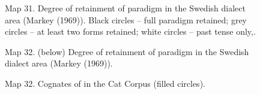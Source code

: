 \begin{figure}[h]
\centering
\begin{minipage}{5.875in}
Map 31. Degree of retainment of paradigm in the Swedish dialect area (Markey (1969)). Black circles – full paradigm retained; grey circles – at least two forms retained; white circles – past tense only,. 
\end{minipage}
\end{figure}
\begin{figure}[h]
\centering
\begin{minipage}{3.62986in}
\label{bkm:Ref224104985}Map 32. (below) Degree of retainment\newline
of paradigm\newline
in the Swedish dialect area\newline
(Markey (1969)).
\end{minipage}
\end{figure}
\clearpage%



\begin{figure}[h]
\centering
\begin{minipage}{6.28125in}
Map  32. Cognates of \textstyleLinguisticExample{ }in the Cat Corpus (filled circles).
\end{minipage}
\end{figure}
\clearpage%


